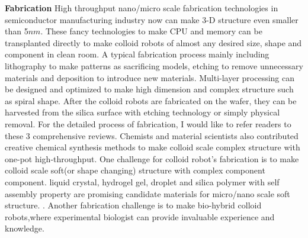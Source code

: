 \textbf{Fabrication}  High throughput nano/micro scale fabrication technologies in semiconductor manufacturing industry now can make 3-D structure even smaller than 5$nm$.\cite{mokhlesi2010three} These fancy technologies to make CPU and memory can be transplanted directly to make colloid robots of almost any desired size, shape and component in clean room.\cite{koman2018colloidal} A typical fabrication process mainly including lithography to make patterns as sacrificing models, etching to remove unnecessary materials and deposition to introduce new materials. Multi-layer processing can be designed and optimized to make high dimension and complex structure such as spiral shape\cite{zhang2009artificial}. After the colloid robots are fabricated on the wafer, they can be harvested from the silica surface with etching technology or simply physical removal. For the detailed process of fabrication, I would like to refer readers to these 3 comprehensive reviews\cite{wong2016synthetic,wang2017emerging, zha2018tubular}. Chemists and material scientists also contributed creative chemical synthesis methods to make colloid scale complex structure with one-pot high-throughput\cite{youssef2016shape,gong2017patchy,wang2019active}. One challenge for colloid robot's fabrication is to   make  colloid scale soft(or shape changing) structure with complex component component. liquid crystal, hydrogel gel, droplet and silica polymer with self assembly property are promising candidate materials for micro/nano scale soft structure. \cite{leong2009tetherless,denkov2015self,zhang2017printing,wei2019molecular}. Another fabrication challenge is to make bio-hybrid colloid robots,where experimental biologist can provide invaluable experience and knowledge.\cite{stanton2016biohybrid,magdanz2013development}

